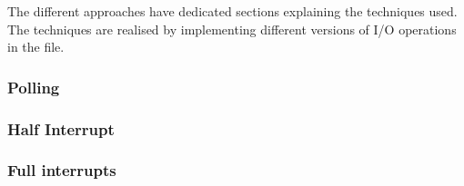 The different approaches have dedicated sections explaining the techniques used. The techniques are realised by implementing different versions of I/O operations in the file.  

\subsubsection{Polling}


\subsubsection{Half Interrupt}


\subsubsection{Full interrupts}

